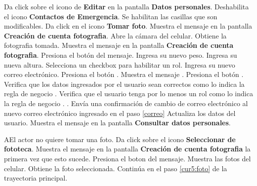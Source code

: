  \begin{UCtrayectoria}
 	
 	\UCpaso [\UCactor] Da click sobre el icono de \textbf{Editar} en la pantalla \textbf{Datos personales}.
 	\UCpaso Deshabilita el icono \textbf{Contactos de Emergencia}.
 	\UCpaso Se habilitan las casillas que son modificables. 	
 	\UCpaso [\UCactor] Da click en el icono \textbf{Tomar foto}. 
 	\UCpaso Muestra el mensaje  en la pantalla \textbf{Creación de cuenta fotografia}.
 	\UCpaso Abre la cámara del celular.\label{cur:otrafoto}
 	\UCpaso Obtiene la fotografia tomada.
 	\UCpaso Muestra el mensaje  en la pantalla \textbf{Creación de cuenta fotografia}.
 	\UCpaso [\UCactor] Presiona el botón  del mensaje.
 	\UCpaso [\UCactor] Ingresa su nuevo peso.\label{cur5:foto}
 	\UCpaso [\UCactor] Ingresa su nueva altura.
 	\UCpaso [\UCactor] Selecciona un checkbox para habilitar un rol.   \label{roles}
 	\UCpaso [\UCactor] Ingresa su nuevo correo electrónico.  \label{correo}
 	\UCpaso [\UCactor] Presiona el botón .
 	\UCpaso Muestra el mensaje .
 	\UCpaso [\UCactor] Presiona el botón .
 	\UCpaso Verifica que los datos ingresados por el usuario sean correctos como lo indica la regla de negocio . 
 	\UCpaso Verifica que el usuario tenga por lo menos un rol como lo indica la regla de negocio . .
 	\UCpaso Envía una confirmación de cambio de correo electrónico al nuevo correo electrónico ingresado en el paso \ref{correo}
 	\UCpaso Actualiza los datos del usuario.
 	\UCpaso Muestra el mensaje  en la pantalla \textbf{Consultar datos personales}.
 	
 	 
 	

 \end{UCtrayectoria}

 \begin{UCtrayectoriaA}{A}{El actor no quiere tomar una foto.}
 	\UCpaso [\UCactor] Da click sobre el icono \textbf{Seleccionar de fototeca}.
 	\UCpaso Muestra el mensaje  en la pantalla \textbf{Creación de cuenta fotografia} la primera vez que esto sucede.
 	\UCpaso [\UCactor] Presiona el boton  del mensaje.
 	\UCpaso Muestra las fotos del celular.
 	\UCpaso Obtiene la foto seleccionada.
 	\UCpaso Continúa en el paso \ref{cur5:foto} de la trayectoria principal.
 	
 \end{UCtrayectoriaA}

